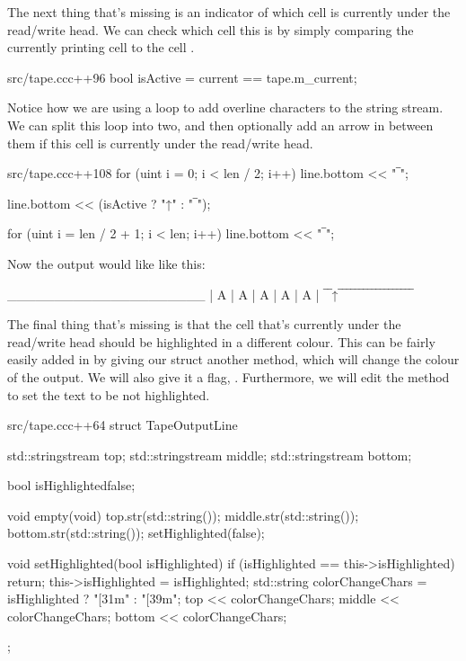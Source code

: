 The next thing that's missing is an indicator of which cell is currently under the read/write head. We can check which cell this is by simply comparing the currently printing cell to the cell .

\begin{file}{src/tape.cc}{c++}{96}
        bool isActive = current == tape.m_current;
\end{file}

Notice how we are using a  loop to add overline characters to the  string stream. We can split this loop into two, and then optionally add an arrow in between them if this cell is currently under the read/write head.

\begin{file}{src/tape.cc}{c++}{108}
        for (uint i = 0; i < len / 2; i++)
            line.bottom << "‾";

        line.bottom << (isActive ? "↑" : "‾");

        for (uint i = len / 2 + 1; i < len; i++)
            line.bottom << "‾";
\end{file}

Now the output would like like this:
\begin{stdout}
_____________________
| A | A | A | A | A |
‾‾↑‾‾‾‾‾‾‾‾‾‾‾‾‾‾‾‾‾‾
\end{stdout}

The final thing that's missing is that the cell that's currently under the read/write head should be highlighted in a different colour. This can be fairly easily added in by giving our  struct another method,  which will change the colour of the output. We will also give it a flag, . Furthermore, we will edit the  method to set the text to be not highlighted.

\begin{file}{src/tape.cc}{c++}{64}
struct TapeOutputLine
{
    std::stringstream top;
    std::stringstream middle;
    std::stringstream bottom;

    bool isHighlighted{false};

    void empty(void)
    {
        top.str(std::string());
        middle.str(std::string());
        bottom.str(std::string());
        setHighlighted(false);
    }

    void setHighlighted(bool isHighlighted)
    {
        if (isHighlighted == this->isHighlighted)
            return;
        this->isHighlighted = isHighlighted;
        std::string colorChangeChars = isHighlighted ? "[31m" : "[39m";
        top << colorChangeChars;
        middle << colorChangeChars;
        bottom << colorChangeChars;
    }
};
\end{file}

